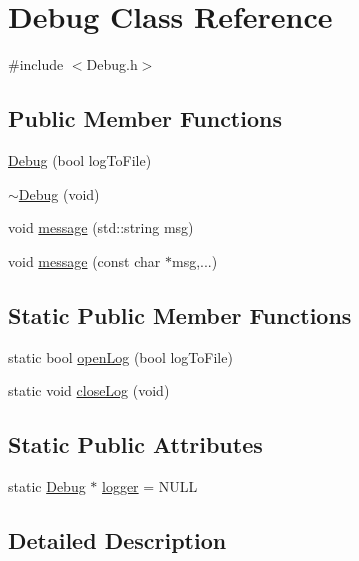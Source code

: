 \hypertarget{class_debug}{
\section{Debug Class Reference}
\label{class_debug}
}


{\ttfamily \#include $<$Debug.h$>$}

\subsection*{Public Member Functions}
\begin{DoxyCompactItemize}
\item 
\hyperlink{class_debug_ace4118d95ec0e79f5fa4d7248e94b569}{Debug} (bool logToFile)
\item 
\hyperlink{class_debug_adcb21888f9ca900feee3bdab564c47c3}{$\sim$Debug} (void)
\item 
void \hyperlink{class_debug_a7f171818a11f4d6b8dee3b44c4d6f0a7}{message} (std::string msg)
\item 
void \hyperlink{class_debug_afb2b4be02c39146a0e3a388b1d2a9883}{message} (const char $\ast$msg,...)
\end{DoxyCompactItemize}
\subsection*{Static Public Member Functions}
\begin{DoxyCompactItemize}
\item 
static bool \hyperlink{class_debug_a70ec5b616303ab46c46f6e231799d07f}{openLog} (bool logToFile)
\item 
static void \hyperlink{class_debug_aab477ba859e35b69510dee5e7bc476e4}{closeLog} (void)
\end{DoxyCompactItemize}
\subsection*{Static Public Attributes}
\begin{DoxyCompactItemize}
\item 
static \hyperlink{class_debug}{Debug} $\ast$ \hyperlink{class_debug_ace75e2aa3105e64f9fc82c537b45135d}{logger} = NULL
\end{DoxyCompactItemize}


\subsection{Detailed Description}



